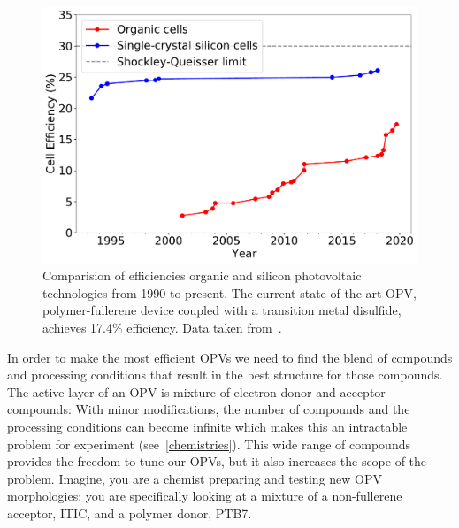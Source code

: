 \begin{figure}[h!]
    \centering
    \includegraphics[width=0.8\linewidth]{images/NREL2020.pdf}
    \caption{Comparision of efficiencies organic and silicon photovoltaic technologies from 1990 to present. The current state-of-the-art OPV, polymer-fullerene device coupled with a transition metal disulfide, achieves 17.4\% efficiency\cite{Lin2019}. Data taken from~\cite{NREL2020}.}\label{nrel}
\end{figure}

In order to make the most efficient OPVs we need to find the blend of compounds and processing conditions that result in the best structure for those compounds.
The active layer of an OPV is mixture of electron-donor and acceptor compounds: 
With minor modifications, the number of compounds and the processing conditions can become infinite which makes this an intractable problem for experiment (see~\autoref{chemistries}).
This wide range of compounds provides the freedom to tune our OPVs, but it also increases the scope of the problem.
Imagine, you are a chemist preparing and testing new OPV morphologies: you are specifically looking at a mixture of a non-fullerene acceptor, ITIC, and a polymer donor, PTB7. 

